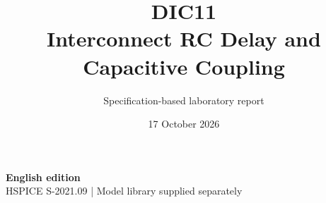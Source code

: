 \documentclass[11pt,a4paper]{article}
\title{\color{accent}DIC11\\[4pt]Interconnect RC Delay and Capacitive Coupling}
\author{Specification-based laboratory report}
\date{17 October 2026}
\begin{document}
\maketitle
\begin{center}\small\textbf{English edition}\\
HSPICE S-2021.09 \quad | \quad Model library supplied separately
\end{center}


\end{document}
